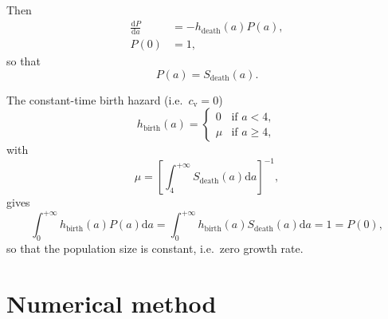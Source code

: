 \documentclass[12pt]{article}
\newcommand{\md}{\mathrm{d}}
\begin{document}
Then
\begin{subequations}
  \begin{align}
    \frac{\md P}{\md a}
    &= - h_{\text{death}}(a) P(a), \\
    P(0) &= 1,
  \end{align}
\end{subequations}
so that
\begin{equation}
  P(a) = S_{\text{death}}(a).
\end{equation}

The constant-time birth hazard
(i.e.~$c_{\mathrm{v}} = 0$)
\begin{equation}
  h_{\text{birth}}(a) =
  \begin{cases}
    0 & \text{if $a < 4$}, \\
    \mu & \text{if $a \geq 4$},
  \end{cases}
\end{equation}
with
\begin{equation}
  \mu =
  \left[
    \int_4^{+\infty} S_{\text{death}}(a) \md a
  \right]^{-1},
\end{equation}
gives
\begin{equation}
  \int_0^{+\infty} h_{\text{birth}}(a) P(a) \md a
  = \int_0^{+\infty} h_{\text{birth}}(a) S_{\text{death}}(a) \md a
  = 1
  = P(0),
\end{equation}
so that the population size is constant, i.e.~zero growth rate.


\section{Numerical method}
\end{document}
